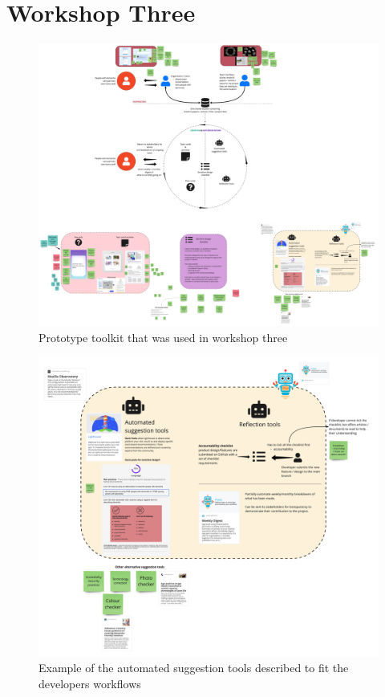 \newpage
\section{Workshop Three}
\label{D3:W3}
\begin{figure}[htp]
    \centering
    \includegraphics[width=0.6\linewidth]{Images/Appendix/D3Toolkit/Workshop3-Overall.jpg}
    \caption{Prototype toolkit that was used in workshop three}
    \label{fig:App:W3}
\end{figure}

\begin{figure}[htp]
    \centering
    \includegraphics[width=0.6\linewidth]{Images/Appendix/D3Toolkit/Workshop3Creation.jpg}
    \caption{Example of the automated suggestion tools described to fit the developers workflows}
    \label{fig:App:W3-AutomtedTools}
\end{figure}